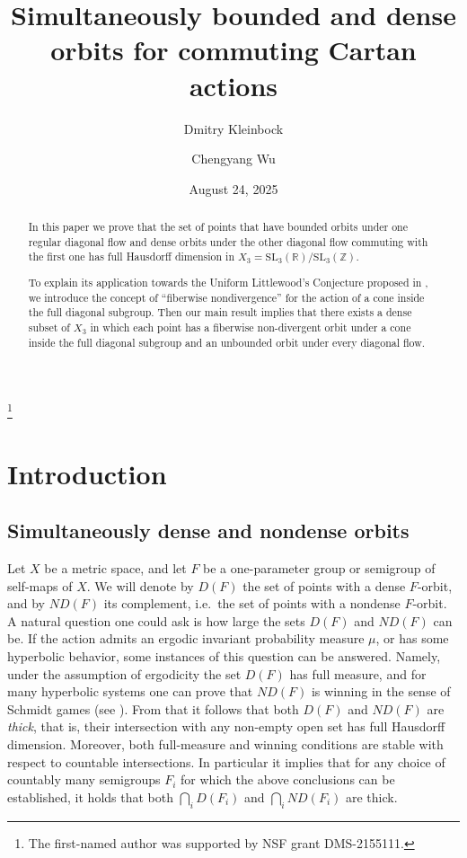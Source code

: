 \documentclass[reqno,12pt]{amsart}
\theoremstyle{definition}
\numberwithin{equation}{section}
\newcommand{\RR}{\mathbb{R}}
\newcommand{\ZZ}{\mathbb{Z}}
\newcommand{\SL}{\mathrm{SL}}
\newcommand {\comm}[1]   {\textcolor{red}{#1}}
\begin{document}
\title{Simultaneously bounded and dense orbits for commuting Cartan actions}
\author{Dmitry Kleinbock}
\address{Department of Mathematics, Brandeis University, Waltham MA}


\author{Chengyang Wu}
\address{School of Mathematical Sciences, Peking University, Beijing, 100871, China}
\date{August 24, 2025}
\thanks{The first-named author was supported by NSF grant DMS-2155111.}

\begin{abstract}
    In this paper we prove that the set of points that have bounded orbits under one regular diagonal flow and dense orbits under the other diagonal flow commuting with the first one has full Hausdorff dimension in $X_3=\SL_3(\RR)/\SL_3(\ZZ)$. 

    To explain its application towards the Uniform Littlewood's Conjecture proposed in \cite{BFK25}, we introduce the concept of ``fiberwise nondivergence'' for the action of a cone inside the full diagonal subgroup. Then our main result implies that there exists a dense subset of $X_3$ in which each point has a fiberwise non-divergent orbit under a cone inside the full diagonal subgroup and an unbounded orbit under every diagonal flow. 
\end{abstract}

\maketitle


\section{Introduction}

\subsection{Simultaneously dense and nondense orbits}

Let $X$ be a metric space, and let $F$ be a one-parameter group or semigroup of self-maps of $X$.  We will denote by $D(F)$ the set of points with a dense $F$-orbit, and by $ND(F)$ its complement, i.e.\ the set of points with a nondense $F$-orbit. A natural question one could ask  is how large the sets $D(F)$   and   $ND(F)$ can be. If the action admits an ergodic invariant probability measure $\mu$, or has some hyperbolic behavior, some instances of this question can be  answered. Namely, under the assumption of ergodicity the set  $D(F)$ has full measure, and for many hyperbolic systems one can prove %
that $ND(F)$ is winning in the sense of Schmidt games (see \cite{BFK11,Da88,T09,T16,wu16,wu18}).
From that it follows that both $D(F)$   and   $ND(F)$ are {\sl thick}, that is, their intersection with any non-empty open set has full Hausdorff dimension. 
Moreover, both full-measure and winning conditions are stable with respect to countable intersections. In particular it implies that for any choice of countably many semigroups $F_i$ for which the above conclusions can be established, it holds that both $\bigcap_i D(F_i)$   and   $\bigcap_i ND(F_i)$  are thick.
\end{document}
